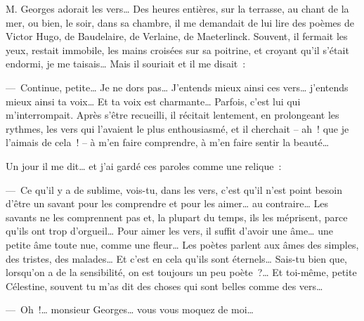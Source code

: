 {

M. Georges adorait les vers… Des heures entières, sur la terrasse, au
chant de la mer, ou bien, le soir, dans sa chambre, il me demandait
de lui lire des poèmes de Victor Hugo, de Baudelaire, de Verlaine, de
Maeterlinck. Souvent, il fermait les yeux, restait immobile, les
mains croisées sur sa poitrine, et croyant qu'il s'était endormi, je
me taisais… Mais il souriait et il me disait~:

---~Continue, petite… Je ne dors pas… J'entends mieux ainsi ces vers…
j'entends mieux ainsi ta voix… Et ta voix est charmante… Parfois,
c'est lui qui m'interrompait. Après s'être recueilli, il récitait
lentement, en prolongeant les rythmes, les vers qui l'avaient le plus
enthousiasmé, et il cherchait – ah~! que je l'aimais de cela~! – à
m'en faire comprendre, à m'en faire sentir la beauté…

Un jour il me dit… et j'ai gardé ces paroles comme une relique~:

---~Ce qu'il y a de sublime, vois-tu, dans les vers, c'est qu'il n'est
point besoin d'être un savant pour les comprendre et pour les aimer…
au contraire… Les savants ne les comprennent pas et, la plupart du
temps, ils les méprisent, parce qu'ils ont trop d'orgueil… Pour aimer
les vers, il suffit d'avoir une âme… une petite âme toute nue, comme
une fleur… Les poètes parlent aux âmes des simples, des tristes, des
malades… Et c'est en cela qu'ils sont éternels… Sais-tu bien que,
lorsqu'on a de la sensibilité, on est toujours un peu poète~?… Et
toi-même, petite Célestine, souvent tu m'as dit des choses qui sont
belles comme des vers…

---~Oh~!… monsieur Georges… vous vous moquez de moi…

}
